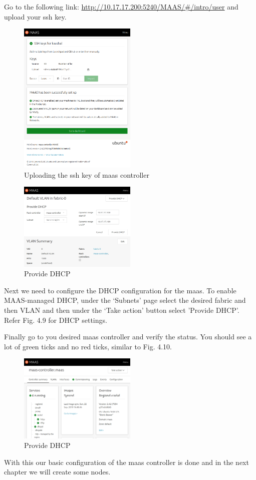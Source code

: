 Go to the following link: \url{http://10.17.17.200:5240/MAAS/#/intro/user} and upload your ssh key.

\begin{figure}[!ht]
    \centering
    \includegraphics[width=0.5\textwidth]{images/4-8.png}
    \caption{Uploading the ssh key of maas controller}
\end{figure}

\begin{figure}[!ht]
    \centering
    \includegraphics[width=0.5\textwidth]{images/4-9.png}
    \caption{Provide DHCP}
\end{figure}

Next we need to configure the DHCP configuration for the maas. To enable MAAS-managed DHCP, under the ‘Subnets’ page select the desired fabric and then VLAN and then under the ‘Take action’ button select 'Provide DHCP'. Refer Fig. 4.9 for DHCP settings.

Finally go to you desired maas controller and verify the status. You should see a lot of green ticks and no red ticks, similar to Fig. 4.10.

\begin{figure}[!ht]
    \centering
    \includegraphics[width=0.5\textwidth]{images/4-10.png}
    \caption{Provide DHCP}
\end{figure}

With this our basic configuration of the maas controller is done and in the next chapter we will create some nodes.